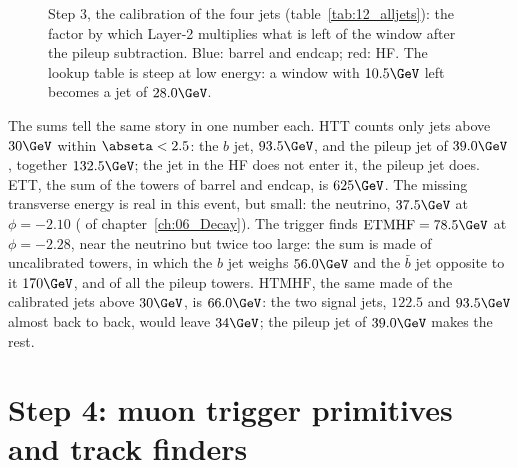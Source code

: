 \begin{figure}[!htb]
\centering
{}
\caption{Step 3, the calibration of the four jets (table~\ref{tab:12_alljets}): the factor by which Layer-2
multiplies what is left of the window after the pileup subtraction. Blue: barrel and endcap; red: HF. The lookup
table is steep at low energy: a window with $10.5\GeV$ left becomes a jet of $28.0\GeV$.}
\label{fig:12_calib}
\end{figure}


The sums tell the same story in one number each. HTT counts only jets above $30\GeV$ within $\abseta<2.5$: the
$b$ jet, $93.5\GeV$, and the pileup jet of $39.0\GeV$, together $132.5\GeV$; the jet in the HF does not enter it, the
pileup jet does. ETT, the sum of the towers of barrel and endcap, is $625\GeV$. The missing transverse energy is real
in this event, but small: the neutrino, $37.5\GeV$ at $\phi=-2.10$ ( of chapter~\ref{ch:06_Decay}).
The trigger finds $\mathrm{ETMHF}=78.5\GeV$ at $\phi=-2.28$, near the neutrino but twice too large: the sum is made of
uncalibrated towers, in which the $b$ jet weighs $56.0\GeV$ and the $\bar b$ jet opposite to it $170\GeV$, and of all
the pileup towers. $\mathrm{HTMHF}$, the same made of the calibrated jets above $30\GeV$, is $66.0\GeV$: the two signal
jets, $122.5$ and $93.5\GeV$ almost back to back, would leave $34\GeV$; the pileup jet of $39.0\GeV$ makes the rest.

\FloatBarrier
\section{Step 4: muon trigger primitives and track finders}

